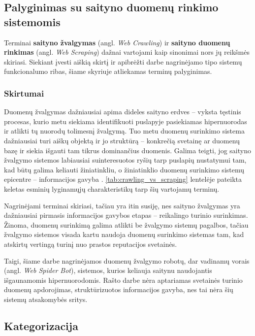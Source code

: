 \subsection{Palyginimas su saityno duomenų rinkimo sistemomis}
Terminai \textbf{saityno žvalgymas} (angl. \textit{Web Crawling}) ir \textbf{saityno duomenų rinkimas} (angl. \textit{Web Scraping}) dažnai vartojami kaip sinonimai nors jų reikšmės skiriasi. Siekiant įvesti aiškią skirtį ir apibrėžti darbe nagrinėjamo tipo sistemų funkcionalumo ribas, šiame skyriuje atliekamas terminų palyginimas. 

\subsubsection{Skirtumai}

Duomenų žvalgymas dažniausiai apima dideles saityno erdves -- vyksta tęstinis procesas, kurio metu siekiama identifikuoti puslapyje pasiekiamas hipernuorodas ir atlikti tų nuorodų tolimesnį žvalgymą. Tuo metu duomenų surinkimo sistema dažniausiai turi aiškų objektą ir jo struktūrą -- konkrečią svetainę ar duomenų bazę ir siekia išgauti tam tikrus dominančius duomenis. Galima teigti, jog saityno žvalgymo sistemos labiausiai suinteresuotos ryšių tarp puslapių nustatymui tam, kad būtų galima keliauti žiniatinkliu, o žiniatinklio duomenų surinkimo sistemų epicentre -- informacijos gavyba \cite{OxylabsScrapingVsCrawling}. \ref{tab:crawling_vs_scraping} lentelėje pateikta keletas esminių lyginamųjų charakteristikų tarp šių vartojamų terminų.


Nagrinėjami terminai skiriasi, tačiau yra itin susiję, nes saityno žvalgymas yra dažniausiai pirmasis informacijos gavybos etapas -- reikalingo turinio surinkimas. Žinoma, duomenų surinkimą galima atlikti be žvalgymo sistemų pagalbos, tačiau žvalgymo sistemos visada kartu naudoja duomenų surinkimo sistemas tam, kad atskirtų vertingą turinį nuo prastos reputacijos svetainės. \cite{OxylabsScrapingVsCrawling}

Taigi, šiame darbe nagrinėjamos duomenų žvalgymo robotų, dar vadinamų vorais (angl. \textit{Web Spider Bot}), sistemos, kurios keliauja saitynu naudojantis išgaunamomis hipernuorodomis. Rašto darbe nėra aptariamas svetainės turinio duomenų apdorojimas, struktūrizuotos informacijos gavyba, nes tai nėra šių sistemų atsakomybės sritys.

\subsection{Kategorizacija}

